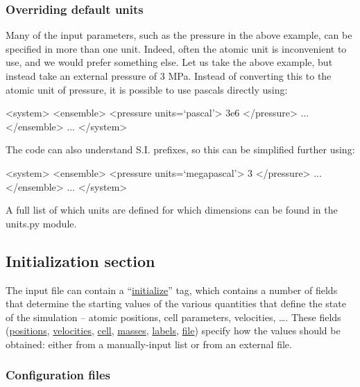 \documentclass[11pt,english,fleqn]{report}
\newenvironment{code}{%
\footnotesize 
\verbatim
}{
\endverbatim
\normalsize
}
\begin{document}
\subsubsection{Overriding default units}

\label{inputunits}

Many of the input parameters, such as the pressure in the above example,
can be specified in more than one unit. Indeed, often the atomic unit
is inconvenient to use, and we would prefer something else. Let us
take the above example, but instead take an external pressure of 3
MPa. Instead of converting this to the atomic unit of pressure, it
is possible to use pascals directly using:

\begin{code}
<system>
   <ensemble>
      <pressure units=`pascal'> 3e6 </pressure>
      ...
   </ensemble>
   ...
</system>
\end{code}

The code can also understand S.I. prefixes, so this can be simplified
further using:

\begin{code}
<system>
   <ensemble>
      <pressure units=`megapascal'> 3 </pressure>
      ...
   </ensemble>
   ...
</system>
\end{code}

A full list of which units are defined for which dimensions
can be found in the units.py module.


\subsection{Initialization section}

The input file can contain a {}``\hyperref[INITIALIZER]{initialize}'' tag, which
contains a number of fields that determine the starting values of the various
quantities that define the state of the simulation -- atomic positions, cell parameters, velocities, \ldots.
These fields (\hyperref[INITPOSITIONS]{positions},  \hyperref[INITVELOCITIES]{velocities},  
\hyperref[INITCELL]{cell},  \hyperref[INITMASSES]{masses},  \hyperref[INITLABELS]{labels},
\hyperref[INITFILE]{file}) specify how the values should be obtained: 
either from a manually-input list or from an external file.   

\subsubsection{Configuration files}
\end{document}
